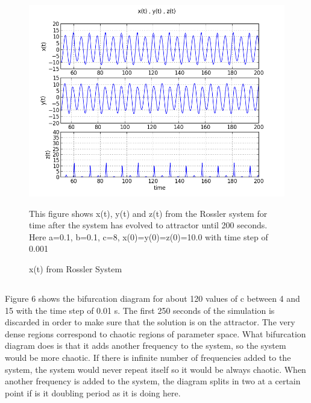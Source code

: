 \documentclass[letterpaper,12pt]{article}
\begin{document}
\FloatBarrier
\begin{figure}[h!]
\centering
\includegraphics[scale=0.7]{1_c_8.png}
\caption{x(t) from Rossler System}
This figure shows x(t), y(t) and z(t) from the Rossler system for time after the system has evolved to attractor until 200 seconds. Here a=0.1, b=0.1, c=8, x(0)=y(0)=z(0)=10.0 with time step of 0.001
\end{figure}
\FloatBarrier


\subsection{}
Figure 6 shows the bifurcation diagram for about 120 values of c between 4 and 15 with the time step of 0.01 s. The first 250 seconds of the simulation is discarded in order to make sure that the solution is on the attractor. The very dense regions correspond to chaotic regions of parameter space. What bifurcation diagram does is that it adds another frequency to the system, so the system would be more chaotic. If there is infinite number of frequencies added to the system, the system would never repeat itself so it would be always chaotic. When another frequency is added to the system, the diagram splits in two at a certain point if is it doubling period as it is doing here.
\end{document}
